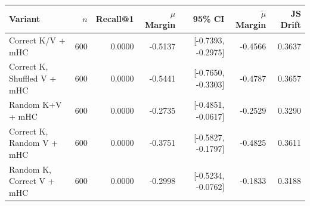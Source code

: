\begin{tabular}{l r r r r r r}
\toprule
Variant & $n$ & Recall@1 & $\mu$ Margin & 95\% CI & $\tilde{\mu}$ Margin & JS Drift \\
\midrule
Correct K/V + mHC & 600 & 0.0000 & -0.5137 & [-0.7393, -0.2975] & -0.4566 & 0.3637 \\
Correct K, Shuffled V + mHC & 600 & 0.0000 & -0.5441 & [-0.7650, -0.3303] & -0.4787 & 0.3657 \\
Random K+V + mHC & 600 & 0.0000 & -0.2735 & [-0.4851, -0.0617] & -0.2529 & 0.3290 \\
Correct K, Random V + mHC & 600 & 0.0000 & -0.3751 & [-0.5827, -0.1797] & -0.4825 & 0.3611 \\
Random K, Correct V + mHC & 600 & 0.0000 & -0.2998 & [-0.5234, -0.0762] & -0.1833 & 0.3188 \\
\bottomrule
\end{tabular}
